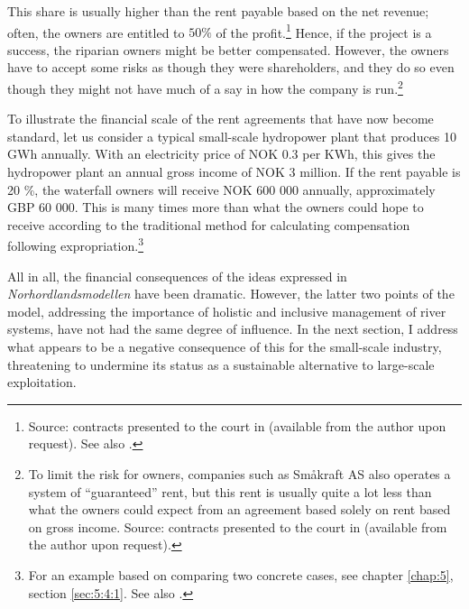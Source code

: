 This share is usually higher than the rent payable based on the net revenue; often, the owners are entitled to $50 \%$ of the profit.\footnote{Source: contracts presented to the court in \cite{sauda09} (available from the author upon request). See also \cite[58]{hauge15}.} Hence, if the project is a success, the riparian owners might be better compensated. However, the owners have to accept some risks as though they were shareholders, and they do so even though they might not have much of a say in how the company is run.\footnote{To limit the risk for owners, companies such as Småkraft AS also operates a system of ``guaranteed'' rent, but this rent is usually quite a lot less than what the owners could expect from an agreement based solely on rent based on gross income. Source: contracts presented to the court in \cite{sauda09} (available from the author upon request).}

To illustrate the financial scale of the rent agreements that have now become standard, let us consider a typical small-scale hydropower plant that produces 10 GWh annually. With an electricity price of NOK 0.3 per KWh, this gives the hydropower plant an annual gross income of NOK 3 million. If the rent payable is 20 \%, the waterfall owners will receive NOK 600 000 annually, approximately GBP 60 000. This is many times more than what the owners could hope to receive according to the traditional method for calculating compensation following expropriation.\footnote{For an example based on comparing two concrete cases, see chapter \ref{chap:5}, section \ref{sec:5:4:1}. See also \cite[283-289]{hauge15}.}


All in all, the financial consequences of the ideas expressed in {\it Norhordlandsmodellen} have been dramatic. However, the latter two points of the model, addressing the importance of holistic and inclusive management of river systems, have not had the same degree of influence. In the next section, I address what appears to be a negative consequence of this for the small-scale industry, threatening to undermine its status as a sustainable alternative to large-scale exploitation.

